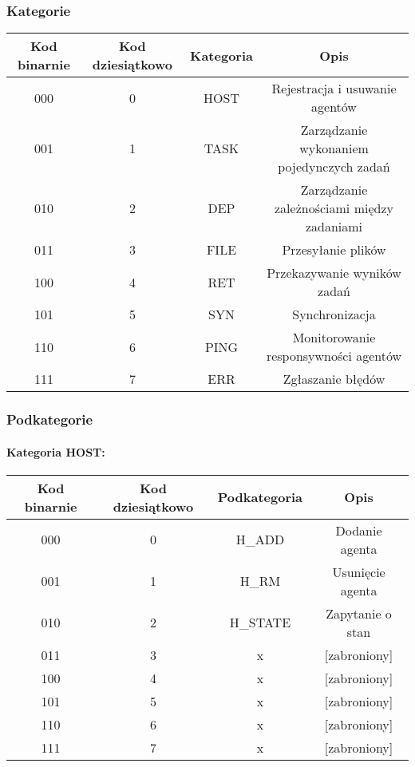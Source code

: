 \documentclass[10pt,a4paper]{article}
\begin{document}
	        \subsubsection{Kategorie}
		        \begin{tabular}{ c | c | c | c }
				    \textbf{Kod binarnie} & \textbf{Kod dziesiątkowo} & \textbf{Kategoria} & \textbf{Opis} \\
				    \hline
				    000 & 0 & HOST & Rejestracja i usuwanie agentów \\
				    001 & 1 & TASK & Zarządzanie wykonaniem pojedynczych zadań \\
				    010 & 2 & DEP & Zarządzanie zależnościami między zadaniami \\
				    011 & 3 & FILE & Przesyłanie plików \\
				    100 & 4 & RET & Przekazywanie wyników zadań \\
				    101 & 5 & SYN & Synchronizacja \\
				    110 & 6 & PING & Monitorowanie responsywności agentów \\
				    111 & 7 & ERR & Zgłaszanie błędów \\
				\end{tabular}
					
			\subsubsection{Podkategorie}
			
			 \paragraph{Kategoria HOST:\\}
			    
		        \begin{tabular}{ c | c | c | c }
				    \textbf{Kod binarnie} & \textbf{Kod dziesiątkowo} & \textbf{Podkategoria} & \textbf{Opis} \\
				    \hline
				    000 & 0 & H\_ADD & Dodanie agenta \\
				    001 & 1 & H\_RM & Usunięcie agenta \\
				    010 & 2 & H\_STATE & Zapytanie o stan \\
				    011 & 3 & x & [zabroniony] \\
				    100 & 4 & x & [zabroniony] \\
				    101 & 5 & x & [zabroniony] \\
				    110 & 6 & x & [zabroniony] \\
				    111 & 7 & x & [zabroniony] \\
				\end{tabular}
				
\end{document}
